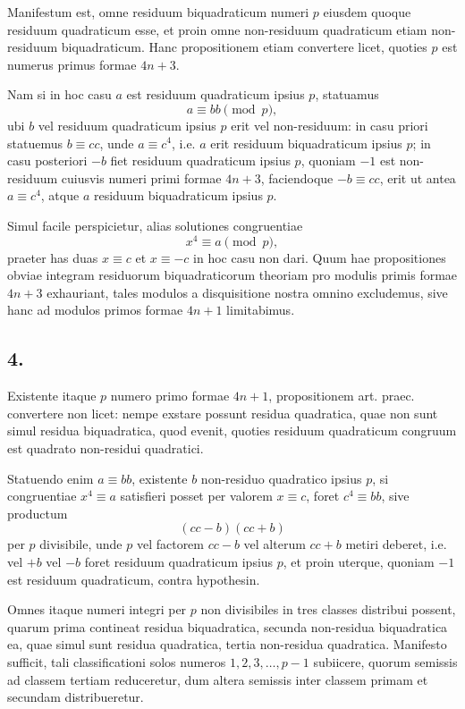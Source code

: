 \documentclass[12pt]{article}
\begin{document}
Manifestum est, omne residuum biquadraticum numeri $p$ eiusdem quoque residuum quadraticum esse, et proin omne non-residuum quadraticum etiam non-residuum biquadraticum. Hanc propositionem etiam convertere licet, quoties $p$ est numerus primus formae $4n+3$.

Nam si in hoc casu $a$ est residuum quadraticum ipsius $p$, statuamus
\[
a\equiv bb \pmod p,
\]
ubi $b$ vel residuum quadraticum ipsius $p$ erit vel non-residuum: in casu priori statuemus $b\equiv cc$, unde $a\equiv c^4$, i.e. $a$ erit residuum biquadraticum ipsius $p$; in casu posteriori $-b$ fiet residuum quadraticum ipsius $p$, quoniam $-1$ est non-residuum cuiusvis numeri primi formae $4n+3$, faciendoque $-b\equiv cc$, erit ut antea $a\equiv c^4$, atque $a$ residuum biquadraticum ipsius $p$.

Simul facile perspicietur, alias solutiones congruentiae
\[
x^4\equiv a\pmod p,
\]
praeter has duas $x\equiv c$ et $x\equiv -c$ in hoc casu non dari. Quum hae propositiones obviae integram residuorum biquadraticorum theoriam pro modulis primis formae $4n+3$ exhauriant, tales modulos a disquisitione nostra omnino excludemus, sive hanc ad modulos primos formae $4n+1$ limitabimus.

\subsection*{4.}

Existente itaque $p$ numero primo formae $4n+1$, propositionem art. praec. convertere non licet: nempe exstare possunt residua quadratica, quae non sunt simul residua biquadratica, quod evenit, quoties residuum quadraticum congruum est quadrato non-residui quadratici.

Statuendo enim $a\equiv bb$, existente $b$ non-residuo quadratico ipsius $p$, si congruentiae $x^4\equiv a$ satisfieri posset per valorem $x\equiv c$, foret $c^4\equiv bb$, sive productum
\[
(cc-b)(cc+b)
\]
per $p$ divisibile, unde $p$ vel factorem $cc-b$ vel alterum $cc+b$ metiri deberet, i.e. vel $+b$ vel $-b$ foret residuum quadraticum ipsius $p$, et proin uterque, quoniam $-1$ est residuum quadraticum, contra hypothesin.

Omnes itaque numeri integri per $p$ non divisibiles in tres classes distribui possent, quarum prima contineat residua biquadratica, secunda non-residua biquadratica ea, quae simul sunt residua quadratica, tertia non-residua quadratica. Manifesto sufficit, tali classificationi solos numeros $1,2,3,\ldots,p-1$ subiicere, quorum semissis ad classem tertiam reduceretur, dum altera semissis inter classem primam et secundam distribueretur.
\end{document}
